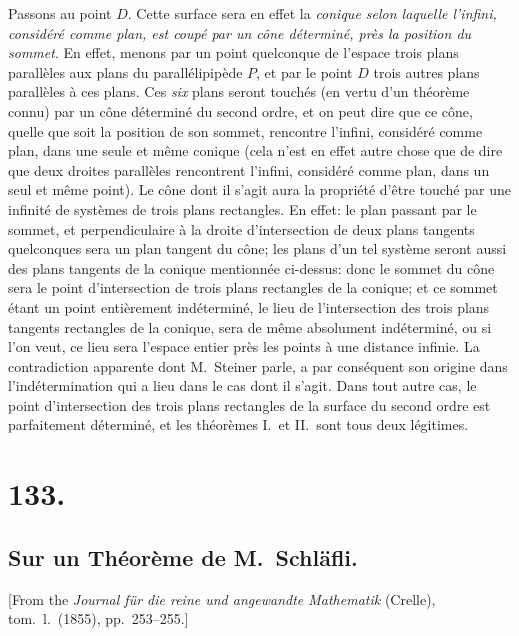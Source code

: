 \documentclass[11pt,a4paper]{article}
\theoremstyle{definition}
\begin{document}
Passons au point $D$. Cette surface sera en effet la \textit{conique selon
laquelle l'infini, consid\'er\'e comme plan, est coup\'e par un c\^one
d\'etermin\'e, pr\`es la position du sommet}. En effet, menons par un point
quelconque de l'espace trois plans parall\`eles aux plans du parall\'elipip\`ede
$P$, et par le point $D$ trois autres plans parall\`eles \`a ces plans. Ces
\textit{six} plans seront touch\'es (en vertu d'un th\'eor\`eme connu) par un
c\^one d\'etermin\'e du second ordre, et on peut dire que ce c\^one, quelle
que soit la position de son sommet, rencontre l'infini, consid\'er\'e comme
plan, dans une seule et m\^eme conique (cela n'est en effet autre chose que
de dire que deux droites parall\`eles rencontrent l'infini, consid\'er\'e
comme plan, dans un seul et m\^eme point). Le c\^one dont il s'agit aura la
propri\'et\'e d'\^etre touch\'e par une infinit\'e de syst\`emes de trois plans
rectangles. En effet: le plan passant par le sommet, et perpendiculaire
\`a la droite d'intersection de deux plans tangents quelconques sera un
plan tangent du c\^one; les plans d'un tel syst\`eme seront aussi des plans
tangents de la conique mentionn\'ee ci-dessus: donc le sommet du c\^one sera
le point d'intersection de trois plans rectangles de la conique; et ce
sommet \'etant un point enti\`erement ind\'etermin\'e, le lieu de
l'intersection des trois plans tangents rectangles de la conique, sera de
m\^eme absolument ind\'etermin\'e, ou si l'on veut, ce lieu sera l'espace
entier pr\`es les points \`a une distance infinie. La contradiction apparente
dont M.~Steiner parle, a par cons\'equent son origine dans l'ind\'etermination
qui a lieu dans le cas dont il s'agit. Dans tout autre cas, le point
d'intersection des trois plans rectangles de la surface du second ordre est
parfaitement d\'etermin\'e, et les th\'eor\`emes I.\ et II.\ sont tous deux
l\'egitimes.

\newpage
\section*{133.}
\subsection*{Sur un Th\'eor\`eme de M.~Schl\"afli.}

[From the \textit{Journal f\"ur die reine und angewandte Mathematik} (Crelle),
tom.\ l.\ (1855), pp.\ 253--255.]
\end{document}
